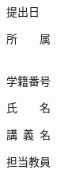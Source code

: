 

\begin{titlepage}

    \begin{flushright}
        {\Large 提出日\quad\SUBMIT}
    \end{flushright}
    
    \begin{center}

        \vspace{150truept}
        
        \hrulefill
        
        \vspace{35truept}
        
        {\huge \TITLE \vspace{-12truept}}
        
        \vspace{35truept}
        
        \hrulefill

        \vspace{180truept}

        {\Large \hspace{70mm}所　　属\hspace{\fill}\UNIVERSITY~\FACULTY\\\hspace{\fill}\DEPARTMENT~\GRADE}

        \vspace{10truept}

        {\Large \hspace{70mm}学籍番号\hspace{\fill}\ID}
        
        \vspace{10truept}
        
        {\Large \hspace{70mm}氏　　名\hspace{\fill}\AUTHOR}

        \vspace{10truept}

        {\Large \hspace{70mm}講\,\,\,義\,\,\,名\hspace{\fill}\LECTURE}

        \vspace{10truept}

        {\Large \hspace{70mm}担当教員\hspace{\fill}\TEACHER}

    \end{center}
    
\end{titlepage}
